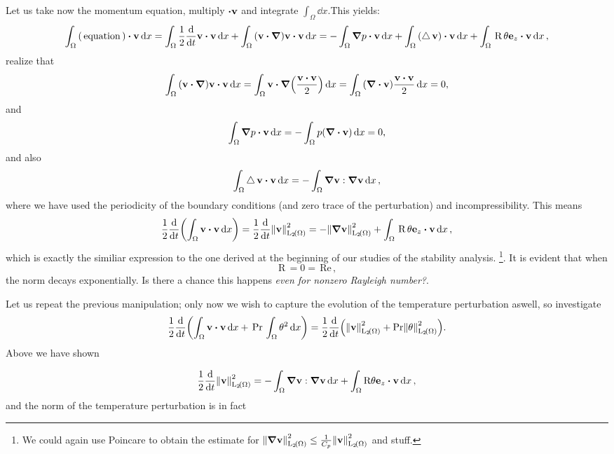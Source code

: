 \documentclass[../main.tex]{subfiles}
\begin{document}
Let us take now the momentum equation, multiply $\vdot \vb{v}$ and integrate $\int_{\Omega}\dd{x}$.This yields:
\[
	\int_{\Omega}\qty(\, \text{equation} \,) \vdot \vb{v}\dd{x} = \int_{\Omega}\frac{1}{2} \dv{t}\vb{v} \vdot \vb{v}\dd{x} + \int_{\Omega}\qty(\vb{v}\vdot \grad)\vb{v} \vdot \vb{v}\dd{x} = - \int_{\Omega}\grad p \vdot \vb{v}\dd{x} + \int_{\Omega}\qty(\laplace \vb{v}) \vdot \vb{v}\dd{x} + \int_{\Omega}\, \text{R} \,\theta \vb{e}_z \vdot \vb{v}\dd{x},
\]
realize that
\[
	\int_{\Omega}\qty(\vb{v}\vdot \grad)\vb{v} \vdot\vb{v}\dd{x} = \int_{\Omega}\vb{v}\vdot \grad\qty(\frac{\vb{v}\vdot \vb{v}}{2})\dd{x} = \int_{\Omega}\qty(\divergence{\vb{v}})\frac{\vb{v}\vdot \vb{v}}{2}\dd{x} = 0,
\]
and
\[
	\int_{\Omega}\grad p \vdot \vb{v}\dd{x} = - \int_{\Omega}p \qty(\divergence{\vb{v}})\dd{x} = 0,
\]
and also
\[
	\int_{\Omega}\laplace \vb{v}\vdot \vb{v}\dd{x} =- \int_{\Omega}\grad \vb{v} : \grad\vb{v}\dd{x},
\]
where we have used the periodicity of the boundary conditions (and zero trace of the perturbation) and incompressibility.
This means
\[
	\frac{1}{2} \dv{t}\qty(\int_{\Omega}\vb{v}\vdot \vb{v}\dd{x}) = \frac{1}{2} \dv{t} \norm{\vb{v}}_{\LpSet[2]{\Omega}}^{2} = - \norm{\grad \vb{v}}_{\LpSet[2]{\Omega}}^{2} + \int_{\Omega}\, \text{R} \, \theta \vb{e}_z \vdot \vb{v}\dd{x},
\]
which is exactly the similiar expression to the one derived at the beginning of our studies of the stability analysis. \footnote{We could again use Poincare to obtain the estimate for $\norm{\grad \vb{v}}_{\LpSet[2]{\Omega}}^{2} \leq \frac{1}{C_p} \norm{\vb{v}}_{\LpSet[2]{\Omega}}^{2}$ and stuff.}. It is evident that when
\[
	\, \text{R} \, = 0 = \, \text{Re} \,,
\]
the norm decays exponentially. Is there a chance this happens \textit{even for nonzero Rayleigh number?}.

Let us repeat the previous manipulation; only now we wish to capture the evolution of the temperature perturbation aswell, so investigate  
\[
	\frac{1}{2}\dv{t}\qty(\int_{\Omega}\vb{v}\vdot \vb{v}\dd{x} + \, \text{Pr} \,\int_{\Omega}\theta^{2}\dd{x}) = \frac{1}{2} \dv{t}\qty(\norm{\vb{v}}_{\LpSet[2]{\Omega}}^{2} +  \Prandtl \norm{\theta}_{\LpSet[2]{\Omega}}^{2}).
\]
Above we have shown 

\[
	\frac{1}{2}\dv{t} \norm{\vb{v}}_{\LpSet[2]{\Omega}}^{2} = - \int_{\Omega}\grad \vb{v} : \grad \vb{v}\dd{x} + \int_{\Omega}\text{R} \theta \vb{e}_z \vdot \vb{v}\dd{x},
\]
and the norm of the temperature perturbation is in fact
\end{document}
